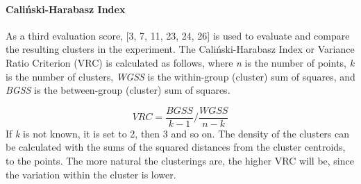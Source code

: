 \paragraph{Caliński-Harabasz Index}
As a third evaluation score, \textcite{calinskiHarabasz}[3, 7, 11, 23, 24, 26] is used to evaluate and compare the resulting clusters in the experiment. 
The Caliński-Harabasz Index or Variance Ratio Criterion (VRC) is calculated as follows, where \textit{n} is the number of points, \textit{k} is the number of clusters, \textit{WGSS} is the within-group (cluster) sum of squares, and \textit{BGSS} is the between-group (cluster) sum of squares.

\[
VRC = \frac{BGSS}{k-1}/\frac{WGSS}{n-k}
\]
If \textit{k} is not known, it is set to 2, then 3 and so on. The density of the clusters can be calculated with the sums of the squared distances from the cluster centroids, to the points. The more natural the clusterings are, the higher VRC will be, since the variation within the cluster is lower.

